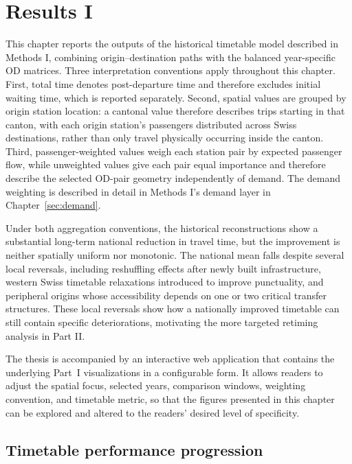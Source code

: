 \documentclass[preprint,12pt]{elsarticle}
\begin{document}
\clearpage


\section{Results I}\label{sec:results-part1}

This chapter reports the outputs of the historical timetable model described in Methods I, combining origin--destination paths with the balanced year-specific OD matrices. Three interpretation conventions apply throughout this chapter. First, total time denotes post-departure time and therefore excludes initial waiting time, which is reported separately. Second, spatial values are grouped by origin station location: a cantonal value therefore describes trips starting in that canton, with each origin station's passengers distributed across Swiss destinations, rather than only travel physically occurring inside the canton. Third, passenger-weighted values weigh each station pair by expected passenger flow, while unweighted values give each pair equal importance and therefore describe the selected OD-pair geometry independently of demand. The demand weighting is described in detail in Methods I's demand layer in Chapter~\ref{sec:demand}. 

Under both aggregation conventions, the historical reconstructions show a substantial long-term national reduction in travel time, but the improvement is neither spatially uniform nor monotonic. The national mean falls despite several local reversals, including reshuffling effects after newly built infrastructure, western Swiss timetable relaxations introduced to improve punctuality, and peripheral origins whose accessibility depends on one or two critical transfer structures. These local reversals show how a nationally improved timetable can still contain specific deteriorations, motivating the more targeted retiming analysis in Part II.

The thesis is accompanied by an interactive web application that contains the underlying Part~I visualizations in a configurable form. It allows readers to adjust the spatial focus, selected years, comparison windows, weighting convention, and timetable metric, so that the figures presented in this chapter can be explored and altered to the readers' desired level of specificity.


\subsection{Timetable performance progression}\label{sec:results-part1-national}
\end{document}
